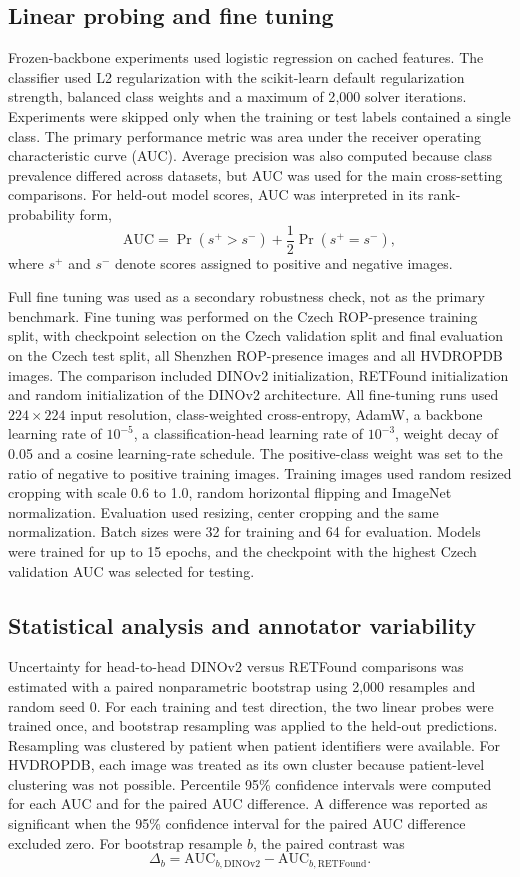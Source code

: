 \documentclass[pdflatex,sn-vancouver,Numbered,iicol]{sn-jnl}
\begin{document}
\subsection{Linear probing and fine tuning}
Frozen-backbone experiments used logistic regression on cached features. The
classifier used L2 regularization with the scikit-learn default regularization
strength, balanced class weights and a maximum of 2{,}000 solver iterations.
Experiments were skipped only when the training or test labels contained a single
class. The primary performance metric was area under the receiver operating
characteristic curve (AUC). Average precision was also computed because class
prevalence differed across datasets, but AUC was used for the main cross-setting
comparisons.
For held-out model scores, AUC was interpreted in its rank-probability form,
\[
\mathrm{AUC}=\Pr(s^+>s^-)+\frac{1}{2}\Pr(s^+=s^-),
\]
where \(s^+\) and \(s^-\) denote scores assigned to positive and negative images.

Full fine tuning was used as a secondary robustness check, not as the primary
benchmark. Fine tuning was performed on the Czech ROP-presence training split,
with checkpoint selection on the Czech validation split and final evaluation on
the Czech test split, all Shenzhen ROP-presence images and all HVDROPDB images.
The comparison included DINOv2 initialization, RETFound initialization and random
initialization of the DINOv2 architecture. All fine-tuning runs used
$224{\times}224$ input resolution, class-weighted cross-entropy, AdamW, a backbone
learning rate of $10^{-5}$, a classification-head learning rate of $10^{-3}$,
weight decay of 0.05 and a cosine learning-rate schedule. The positive-class
weight was set to the ratio of negative to positive training images. Training
images used random resized cropping with scale 0.6 to 1.0, random horizontal
flipping and ImageNet normalization. Evaluation used resizing, center cropping and
the same normalization. Batch sizes were 32 for training and 64 for evaluation.
Models were trained for up to 15 epochs, and the checkpoint with the highest Czech
validation AUC was selected for testing.

\subsection{Statistical analysis and annotator variability}
Uncertainty for head-to-head DINOv2 versus RETFound comparisons was estimated with
a paired nonparametric bootstrap using 2{,}000 resamples and random seed 0. For
each training and test direction, the two linear probes were trained once, and
bootstrap resampling was applied to the held-out predictions. Resampling was
clustered by patient when patient identifiers were available. For HVDROPDB, each
image was treated as its own cluster because patient-level clustering was not
possible. Percentile 95\% confidence intervals were computed for each AUC and for
the paired AUC difference. A difference was reported as significant when the 95\%
confidence interval for the paired AUC difference excluded zero.
For bootstrap resample \(b\), the paired contrast was
\[
\Delta_b=\mathrm{AUC}_{b,\mathrm{DINOv2}}-\mathrm{AUC}_{b,\mathrm{RETFound}}.
\]
\end{document}
